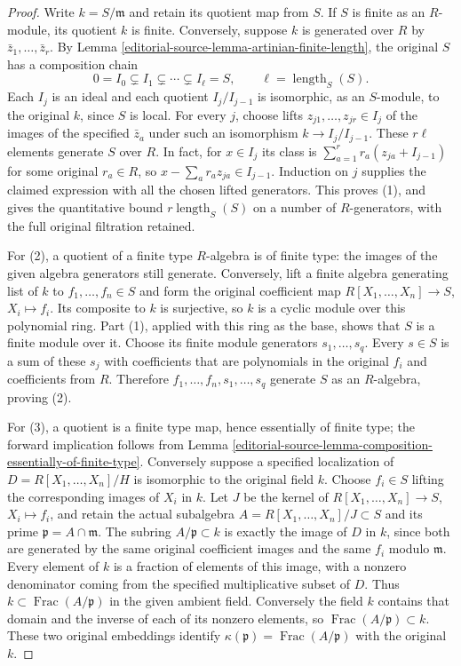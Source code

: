 \begin{proof}
Write $k=S/\mathfrak m$ and retain its quotient map from $S$.
If $S$ is finite as an $R$-module, its quotient $k$ is finite.
Conversely, suppose $k$ is generated over $R$ by
$\bar z_1,\ldots,\bar z_r$. By
Lemma \ref{editorial-source-lemma-artinian-finite-length}, the original $S$
has a composition chain
$$
0=I_0\subsetneq I_1\subsetneq\cdots\subsetneq I_\ell=S,
\qquad \ell=\operatorname{length}_S(S).
$$
Each $I_j$ is an ideal and each quotient $I_j/I_{j-1}$ is
isomorphic, as an $S$-module, to the original $k$, since $S$
is local. For every $j$, choose lifts $z_{j1},\ldots,z_{jr}\in I_j$
of the images of the specified $\bar z_a$ under such an
isomorphism $k\to I_j/I_{j-1}$.
These $r\ell$ elements generate $S$ over $R$.
In fact, for $x\in I_j$ its class is
$\sum_{a=1}^r r_a(z_{ja}+I_{j-1})$ for some original
$r_a\in R$, so $x-\sum_a r_a z_{ja}\in I_{j-1}$.
Induction on $j$ supplies the claimed expression with all the
chosen lifted generators. This proves (1), and gives the
quantitative bound $r\operatorname{length}_S(S)$ on a number
of $R$-generators, with the full original filtration retained.

For (2), a quotient of a finite type $R$-algebra is of finite
type: the images of the given algebra generators still generate.
Conversely, lift a finite algebra generating list of $k$ to
$f_1,\ldots,f_n\in S$ and form the original coefficient map
$R[X_1,\ldots,X_n]\to S$, $X_i\mapsto f_i$.
Its composite to $k$ is surjective, so $k$ is a cyclic module
over this polynomial ring. Part (1), applied with this ring as
the base, shows that $S$ is a finite module over it.
Choose its finite module generators $s_1,\ldots,s_q$.
Every $s\in S$ is a sum of these $s_j$ with coefficients
that are polynomials in the original $f_i$ and coefficients
from $R$. Therefore $f_1,\ldots,f_n,s_1,\ldots,s_q$ generate
$S$ as an $R$-algebra, proving (2).

For (3), a quotient is a finite type map, hence essentially of
finite type; the forward implication follows from
Lemma \ref{editorial-source-lemma-composition-essentially-of-finite-type}.
Conversely suppose a specified localization of
$D=R[X_1,\ldots,X_n]/H$ is isomorphic to the original field
$k$. Choose $f_i\in S$ lifting the corresponding images of
$X_i$ in $k$. Let $J$ be the kernel of
$R[X_1,\ldots,X_n]\to S$, $X_i\mapsto f_i$, and retain
the actual subalgebra
$A=R[X_1,\ldots,X_n]/J\subset S$ and its prime
$\mathfrak p=A\cap\mathfrak m$.
The subring $A/\mathfrak p\subset k$ is exactly the image
of $D$ in $k$, since both are generated by the same original
coefficient images and the same $f_i$ modulo $\mathfrak m$.
Every element of $k$ is a fraction of elements of this image,
with a nonzero denominator coming from the specified
multiplicative subset of $D$. Thus $k\subset
\operatorname{Frac}(A/\mathfrak p)$ in the given ambient field.
Conversely the field $k$ contains that domain and the inverse
of each of its nonzero elements, so
$\operatorname{Frac}(A/\mathfrak p)\subset k$.
These two original embeddings identify
$\kappa(\mathfrak p)=\operatorname{Frac}(A/\mathfrak p)$
with the original $k$.


\end{proof}
